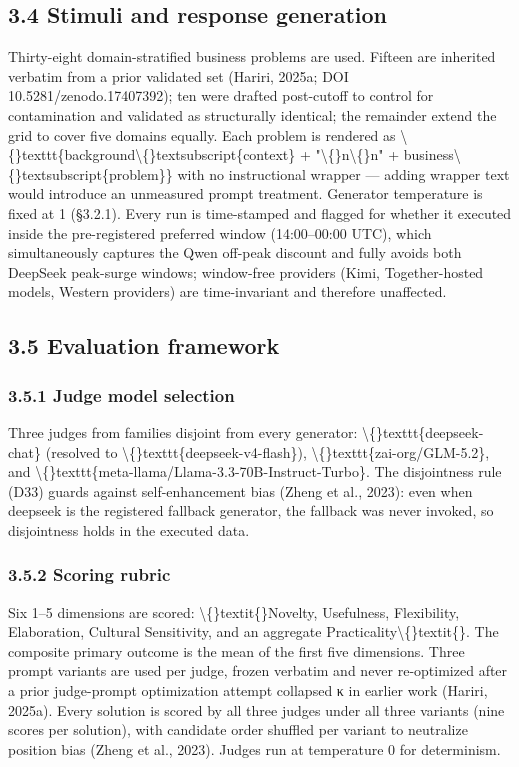 \documentclass[11pt,a4paper]{article}
\begin{document}
\subsection{3.4 Stimuli and response generation}

Thirty-eight domain-stratified business problems are used. Fifteen are
inherited verbatim from a prior validated set (Hariri, 2025a; DOI
10.5281/zenodo.17407392); ten were drafted post-cutoff to control for
contamination and validated as structurally identical; the remainder
extend the grid to cover five domains equally. Each problem is rendered
as \textbackslash\{\}texttt\{background\textbackslash\{\}textsubscript\{context\} + "\textbackslash\{\}n\textbackslash\{\}n" + business\textbackslash\{\}textsubscript\{problem\}\} with no
instructional wrapper — adding wrapper text would introduce an
unmeasured prompt treatment. Generator temperature is fixed at 1
(§3.2.1). Every run is time-stamped and flagged for whether it executed
inside the pre-registered preferred window (14:00–00:00 UTC), which
simultaneously captures the Qwen off-peak discount and fully avoids
both DeepSeek peak-surge windows; window-free providers (Kimi,
Together-hosted models, Western providers) are time-invariant and
therefore unaffected.

\subsection{3.5 Evaluation framework}

\subsubsection{3.5.1 Judge model selection}

Three judges from families disjoint from every generator:
\textbackslash\{\}texttt\{deepseek-chat\} (resolved to \textbackslash\{\}texttt\{deepseek-v4-flash\}), \textbackslash\{\}texttt\{zai-org/GLM-5.2\},
and \textbackslash\{\}texttt\{meta-llama/Llama-3.3-70B-Instruct-Turbo\}. The disjointness rule
(D33) guards against self-enhancement bias (Zheng et al., 2023): even
when deepseek is the registered fallback generator, the fallback was
never invoked, so disjointness holds in the executed data.

\subsubsection{3.5.2 Scoring rubric}

Six 1–5 dimensions are scored: \textbackslash\{\}textit\{\}Novelty, Usefulness, Flexibility,
Elaboration, Cultural Sensitivity, and an aggregate Practicality\textbackslash\{\}textit\{\}.
The composite primary outcome is the mean of the first five
dimensions. Three prompt variants are used per judge, frozen verbatim
and never re-optimized after a prior judge-prompt optimization attempt
collapsed κ in earlier work (Hariri, 2025a). Every solution is
scored by all three judges under all three variants (nine scores per
solution), with candidate order shuffled per variant to neutralize
position bias (Zheng et al., 2023). Judges run at temperature 0 for
determinism.
\end{document}

